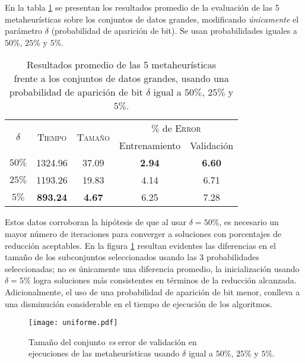 En la tabla \ref{table-unif} se presentan los resultados promedio de la evaluación de las 5 metaheurísticas sobre los conjuntos de datos grandes, modificando \emph{únicamente} el parámetro $\delta$ (probabilidad de aparición de bit). Se usan probabilidades iguales a $50\%$, $25\%$ y $5\%$.

\begin{table}[h!]
\centering
\begin{tabular}{c c c c c}
\hline
\multirow{2}{*}{$\delta$}
	& \multirow{2}{*}{\textsc{Tiempo}}
	& \multirow{2}{*}{\textsc{Tamaño}}
	& \multicolumn{2}{c}{$\%$ de \textsc{Error}} \\\cline{4-5}
 & & & \scriptsize{Entrenamiento} & \scriptsize{Validación} \\
\hline
\hline
$50\%$ & 1324.96 & 37.09 & \textbf{2.94} & \textbf{6.60} \\
$25\%$ & 1193.26 & 19.83 & 4.14 & 6.71 \\
$5\%$  & \textbf{893.24} & \textbf{4.67} & 6.25 & 7.28 \\
\hline
\end{tabular}
\caption[Resultados modificando la probabilidad de aparición de bit]{Resultados promedio de las 5 metaheurísticas\\frente a los conjuntos de datos grandes, usando una\\probabilidad de aparición de bit $\delta$ igual a $50\%$, $25\%$ y $5\%$.}
\label{table-unif}
\end{table}

Estos datos corroboran la hipótesis de que al usar $\delta = 50\%$, es necesario un mayor número de iteraciones para converger a soluciones con porcentajes de reducción aceptables. En la figura \ref{fig-unif} resultan evidentes las diferencias en el tamaño de los subconjuntos seleccionados usando las 3 probabilidades seleccionadas; no es únicamente una diferencia promedio, la inicialización usando $\delta = 5\%$ logra soluciones más consistentes en términos de la reducción alcanzada. Adicionalmente, el uso de una probabilidad de aparición de bit menor, conlleva a una disminución considerable en el tiempo de ejecución de los algoritmos.

\begin{figure}[h!]
\centering
\texttt{[image: uniforme.pdf]}
\caption[Tamaño \emph{vs} error de validación modificando $\delta$]{Tamaño del conjunto \emph{vs} error de validación en\\ejecuciones de las metaheurísticas usando $\delta$ igual a $50\%$, $25\%$ y $5\%$.}
\label{fig-unif}
\end{figure}


